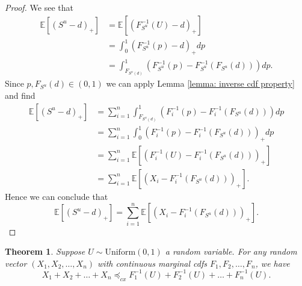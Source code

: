 \documentclass{article}
\newtheorem{theorem}{Theorem}
\begin{document}
\begin{proof}
    We see that
    \begin{align*}
        \mathbb{E}[(S^u - d)_+] &= \mathbb{E}[(F^{-1}_{S^u}(U) - d)_+]\\
        &= \int_0^1 (F_{S^u}^{-1}(p) - d)_+ dp\\
        &= \int_{F_{S^u(d)}}^1(F^{-1}_{S^u}(p) - F^{-1}_{S^u}(F_{S^u}(d )))dp.
    \end{align*}
    Since $p, F_{S^u}(d)\in (0,1)$ we can apply Lemma \ref{lemma: inverse cdf property} and find
    \begin{align*}
        \mathbb{E}[(S^u - d)_+] &= \sum_{i=1}^n\int_{F_{S^u(d)}}^1(F^{-1}_i(p) - F^{-1}_i(F_{S^u}(d )))dp\\
        &= \sum_{i=1}^n\int_0^1(F^{-1}_i(p) - F^{-1}_i(F_{S^u}(d )))_+dp\\
        &= \sum_{i=1}^n\mathbb{E}[(F^{-1}_i(U) - F^{-1}_i(F_{S^u}(d )))_+]\\
        &= \sum_{i=1}^n\mathbb{E}[(X_i - F^{-1}_i(F_{S^u}(d )))_+].
    \end{align*}
    Hence we can conclude that 
    $$\mathbb{E}[(S^u - d)_+] = \sum_{i=1}^n\mathbb{E}[(X_i - F^{-1}_i(F_{S^u}(d )))_+]. $$
\end{proof}
\begin{theorem}\cite[Proposition 1]{kaas-2000}\label{cor: upper bound}
    Suppose $U\sim \text{Uniform}(0,1)$ a random variable. For any random vector $(X_1,X_2,\dots,X_n)$ with continuous marginal cdfs $F_1,F_2,\dots,F_n$, we have
    $$X_1 + X_2 + \dots + X_n \preceq_{cx} F^{-1}_1(U) + F^{-1}_2(U) + \dots + F^{-1}_n(U).$$
\end{theorem}
\end{document}
